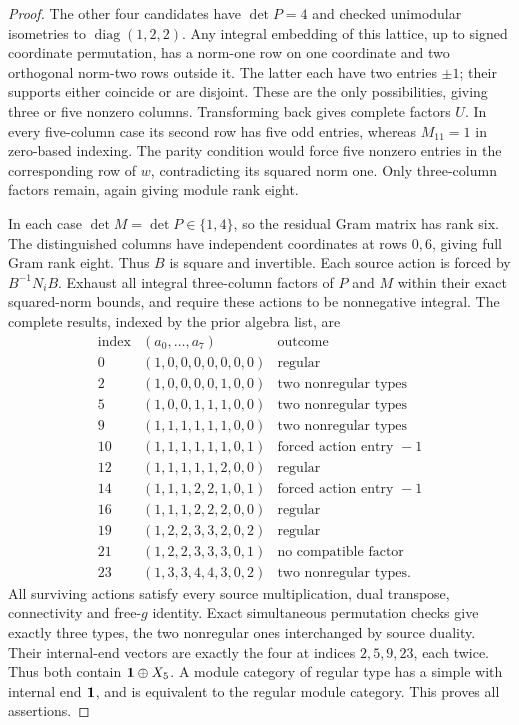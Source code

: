 \begin{proof}
The other four candidates have $\det P=4$ and checked unimodular
isometries to $\operatorname{diag}(1,2,2)$.  Any integral embedding
of this lattice, up to signed coordinate permutation, has a norm-one
row on one coordinate and two orthogonal norm-two rows outside it.
The latter each have two entries $\pm1$; their supports either
coincide or are disjoint.  These are the only possibilities, giving
three or five nonzero columns.  Transforming back gives complete
factors $U$.  In every five-column case its second row has five odd
entries, whereas $M_{11}=1$ in zero-based indexing.  The parity
condition would force five nonzero entries in the corresponding row
of $w$, contradicting its squared norm one.  Only three-column
factors remain, again giving module rank eight.

In each case $\det M=\det P\in\{1,4\}$, so the residual Gram
matrix has rank six.  The distinguished columns have independent
coordinates at rows $0,6$, giving full Gram rank eight.
Thus $B$ is square and invertible.  Each source action is forced by
$B^{-1}N_iB$.  Exhaust all integral three-column factors of $P$ and
$M$ within their exact squared-norm bounds, and require these actions
to be nonnegative integral.  The complete results, indexed by the
prior algebra list, are
\[
\begin{array}{c|l|l}
\text{index}&(a_0,\ldots,a_7)&\text{outcome}\\\hline
0 &(1,0,0,0,0,0,0,0)&\text{regular}\\
2 &(1,0,0,0,0,1,0,0)&\text{two nonregular types}\\
5 &(1,0,0,1,1,1,0,0)&\text{two nonregular types}\\
9 &(1,1,1,1,1,1,0,0)&\text{two nonregular types}\\
10&(1,1,1,1,1,1,0,1)&\text{forced action entry }-1\\
12&(1,1,1,1,1,2,0,0)&\text{regular}\\
14&(1,1,1,2,2,1,0,1)&\text{forced action entry }-1\\
16&(1,1,1,2,2,2,0,0)&\text{regular}\\
19&(1,2,2,3,3,2,0,2)&\text{regular}\\
21&(1,2,2,3,3,3,0,1)&\text{no compatible factor}\\
23&(1,3,3,4,4,3,0,2)&\text{two nonregular types}.
\end{array}
\]
All surviving actions satisfy every source multiplication, dual
transpose, connectivity and free-$g$ identity.  Exact simultaneous
permutation checks give exactly three types, the two nonregular
ones interchanged by source duality.  Their internal-end vectors
are exactly the four at indices $2,5,9,23$, each twice.  Thus both
contain $\mathbf1\oplus X_5$.  A module category of regular type has
a simple with internal end $\mathbf1$, and is equivalent to the regular
module category.  This proves all assertions.
\end{proof}

